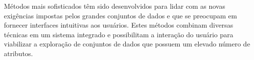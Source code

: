 Métodos mais sofisticados têm sido desenvolvidos para lidar com as novas exigências impostas pelos grandes conjuntos de dados e que se preocupam em fornecer interfaces intuitivas aos usuários. Estes métodos combinam diversas técnicas em um sistema integrado e possibilitam a interação do usuário para viabilizar a exploração de conjuntos de dados que possuem um elevado número de atributos.


